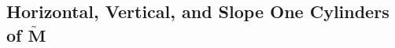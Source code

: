 \documentclass[]{article}
\newtheorem{Def}{Definition}[subsection]
\newcommand{\compat}[1]{\textbf{\textcolor{red}{#1}}}
\begin{document}
%
%
%
%
%
%

\newpage
\subsection{Horizontal, Vertical, and Slope One Cylinders of $\tilde{\mathbf{M}}$}
\begin{figure}[H]
\centering

\end{figure}
\newpage
\end{document}
